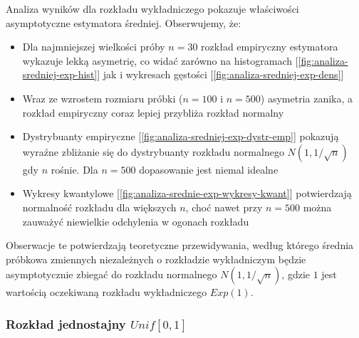 \documentclass[10pt, a4paper]{article}\usepackage[]{graphicx}\usepackage[]{xcolor}
\begin{document}
Analiza wyników dla rozkładu wykładniczego pokazuje właściwości asymptotyczne estymatora średniej. Obserwujemy, że:

\begin{itemize}
  \item Dla najmniejszej wielkości próby $n=30$ rozkład empiryczny estymatora wykazuje lekką asymetrię, co widać zarówno na histogramach [\ref{fig:analiza-sredniej-exp-hist}] jak i wykresach gęstości [\ref{fig:analiza-sredniej-exp-dens}]
  \item Wraz ze wzrostem rozmiaru próbki ($n=100$ i $n=500$) asymetria zanika, a rozkład empiryczny coraz lepiej przybliża rozkład normalny
  \item Dystrybuanty empiryczne [\ref{fig:analiza-sredniej-exp-dystr-emp}] pokazują wyraźne zbliżanie się do dystrybuanty rozkładu normalnego $N(1, 1/\sqrt{n})$ gdy $n$ rośnie. Dla $n=500$ dopasowanie jest niemal idealne
  \item Wykresy kwantylowe [\ref{fig:analiza-srednie-exp-wykresy-kwant}] potwierdzają normalność rozkładu dla większych $n$, choć nawet przy $n=500$ można zauważyć niewielkie odchylenia w ogonach rozkładu
\end{itemize}

Obserwacje te potwierdzają teoretyczne przewidywania, według którego średnia próbkowa zmiennych niezależnych o rozkładzie wykładniczym będzie asymptotycznie zbiegać do rozkładu normalnego $N(1, 1/\sqrt{n})$, gdzie $1$ jest wartością oczekiwaną rozkładu wykładniczego $Exp(1)$.


\newpage 
\subsubsection{Rozkład jednostajny $Unif[0,1]$}
\end{document}
